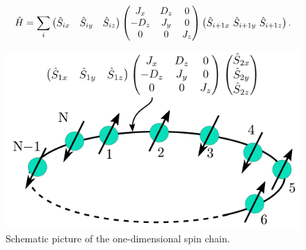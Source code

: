 \documentclass[letterpaper,10pt,dvipdfmx,openany]{sphinxmanual}
\begin{document}
\begin{gather}
\begin{split}\begin{align}
  {\hat H} = \sum_{i}
  \left(
  \begin{matrix}
    {\hat S}_{i x} & {\hat S}_{i y} & {\hat S}_{i z}
  \end{matrix}
  \right)
  \left(
  \begin{matrix}
    J_x & D_z & 0 \\
    -D_z & J_y & 0 \\
    0 & 0 & J_z
  \end{matrix}
  \right)
  \left(
  \begin{matrix}
    {\hat S}_{i+1 x} \ {\hat S}_{i+1 y} \ {\hat S}_{i+1 z}
  \end{matrix}
  \right).
  \end{align}\end{split}\notag
\end{gather}\begin{figure}[htbp]
\centering
\capstart

\includegraphics{spin.png}
\caption{Schematic picture of the one-dimensional spin chain.}\label{shiftk_format_en:spin}\end{figure}
\end{document}
